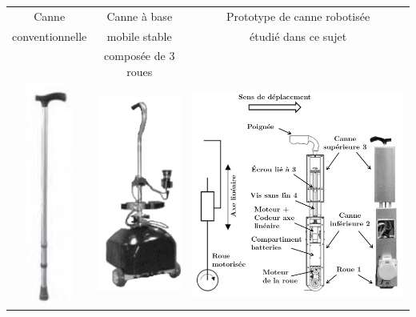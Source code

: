 \begin{center}
\begin{tabular}{|c|c|c|}\hline
Canne & Canne à base  & Prototype de canne robotisée\\
conventionnelle & mobile stable  & étudié dans ce sujet\\
& composée de 3 roues & \\
\includegraphics[width=1.5cm]{img/canneconv} & \includegraphics[width=3cm]{img/canne3roues}  & \includegraphics[width=9.5cm]{img/prescanne}\\\hline
\end{tabular}
\end{center}

